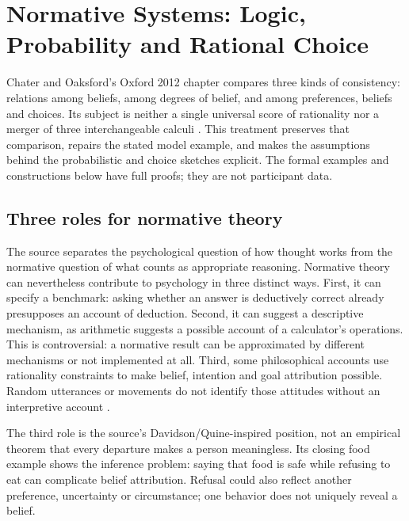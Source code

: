 \chapter{Normative Systems: Logic, Probability and Rational Choice}
\label{sec:p11-normative-systems-comparison}

Chater and Oaksford's Oxford 2012 chapter compares three kinds of consistency:
relations among beliefs, among degrees of belief, and among preferences,
beliefs and choices. Its subject is neither a single universal score of
rationality nor a merger of three interchangeable calculi
\cite{ChaterOaksford2012NormativeSystems}. This treatment preserves that
comparison, repairs the stated model example, and makes the assumptions
behind the probabilistic and choice sketches explicit. The formal examples
and constructions below have full proofs; they are not participant data.

\section{Three roles for normative theory}
\label{sec:p11-nsc-roles}

The source separates the psychological question of how thought works from
the normative question of what counts as appropriate reasoning. Normative
theory can nevertheless contribute to psychology in three distinct ways.
First, it can specify a benchmark: asking whether an answer is deductively
correct already presupposes an account of deduction. Second, it can suggest
a descriptive mechanism, as arithmetic suggests a possible account of a
calculator's operations. This is controversial: a normative result can be
approximated by different mechanisms or not implemented at all. Third,
some philosophical accounts use rationality constraints to make belief,
intention and goal attribution possible. Random utterances or movements
do not identify those attitudes without an interpretive account
\cite[pp.~11--12]{ChaterOaksford2012NormativeSystems}.

The third role is the source's Davidson/Quine-inspired position, not an
empirical theorem that every departure makes a person meaningless. Its
closing food example shows the inference problem: saying that food is
safe while refusing to eat can complicate belief attribution. Refusal
could also reflect another preference, uncertainty or circumstance;
one behavior does not uniquely reveal a belief.

